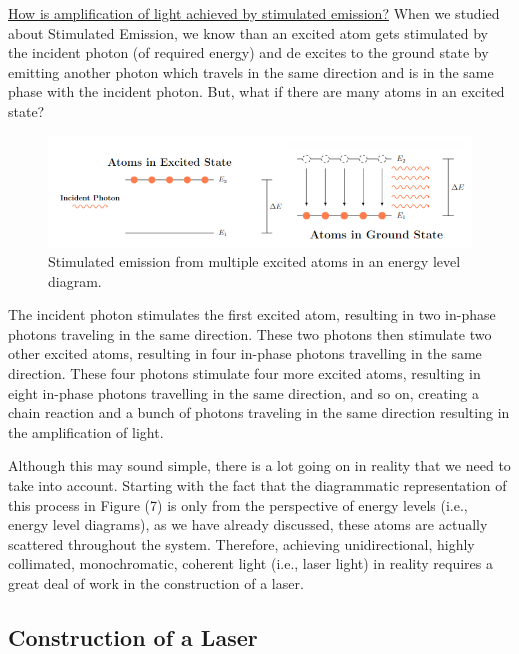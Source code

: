 \documentclass[12pt]{article}
\begin{document}
\uline{How is amplification of light achieved by stimulated emission?} When we studied about Stimulated Emission, we know than an excited atom gets stimulated by the incident photon (of required energy) and de excites to the ground state by emitting another photon which travels in the same direction and is in the same phase with the incident photon. But, what if there are many atoms in an excited state?

\begin{figure}[H]
    \centering
    \includegraphics[scale=.78]{./img/07_amplification.png}
    \caption{Stimulated emission from multiple excited atoms in an energy level diagram.}
\end{figure}

The incident photon stimulates the first excited atom, resulting in two in-phase photons traveling in the same direction. These two photons then stimulate two other excited atoms, resulting in four in-phase photons travelling in the same direction. These four photons stimulate four more excited atoms, resulting in eight in-phase photons travelling in the same direction, and so on, creating a chain reaction and a bunch of photons traveling in the same direction resulting in the amplification of light. \vspace{.3cm}

Although this may sound simple, there is a lot going on in reality that we need to take into account. Starting with the fact that the diagrammatic representation of this process in Figure (7) is only from the perspective of energy levels (i.e., energy level diagrams), as we have already discussed, these atoms are actually scattered throughout the system. Therefore, achieving unidirectional, highly collimated, monochromatic, coherent light (i.e., laser light) in reality requires a great deal of work in the construction of a laser.

\subsection{Construction of a Laser}
\end{document}
